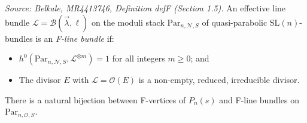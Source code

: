\begin{definition}[FLineBundleStack]
  \label{def:f-line-bundle}
  \textit{Source: Belkale, MR4413746, Definition defF (Section 1.5).}
  An effective line bundle \(\mathcal{L} = \mathcal{B}(\vec{\lambda}, \ell)\) on the moduli stack \(\mathrm{Par}_{n, \mathcal{N}, S}\) of quasi-parabolic \(\mathrm{SL}(n)\)-bundles is an \emph{F-line bundle} if:
  \begin{itemize}
    \item \(h^0(\mathrm{Par}_{n, \mathcal{N}, S}, \mathcal{L}^{\otimes m}) = 1\) for all integers \(m \geq 0\); and
    \item The divisor \(E\) with \(\mathcal{L} = \mathcal{O}(E)\) is a non-empty, reduced, irreducible divisor.
  \end{itemize}
  There is a natural bijection between F-vertices of \(P_n(s)\) and F-line bundles on \(\mathrm{Par}_{n, \mathcal{O}, S}\).
\end{definition}

